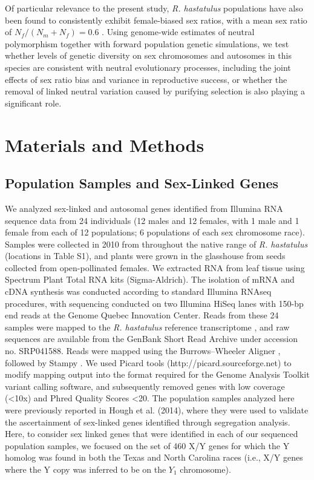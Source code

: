 \documentclass[9pt,twocolumn,twoside]{gsajnl}
\begin{document}
Of particular relevance to the present study, \textit{R. hastatulus} populations have also been found to consistently exhibit female-biased sex ratios, with a mean sex ratio of $N_{f}/(N_{m}+N_{f})=0.6$ \citep{pickup2013influence}. Using genome-wide estimates of neutral polymorphism together with forward population genetic simulations, we test whether levels of genetic diversity on sex chromosomes and autosomes in this species are consistent with neutral evolutionary processes, including the joint effects of sex ratio bias and variance in reproductive success, or whether the removal of linked neutral variation caused by purifying selection is also playing a significant role.

\section*{Materials and Methods}
\subsection*{Population Samples and Sex-Linked Genes}
We analyzed sex-linked and autosomal genes identified from Illumina RNA sequence data from 24 individuals (12 males and 12 females, with 1 male and 1 female from each of 12 populations; 6 populations of each sex chromosome race). Samples were collected in 2010 from throughout the native range of \textit{R. hastatulus} (locations in Table S1), and plants were grown in the glasshouse from seeds collected from open-pollinated females. We extracted RNA from leaf tissue using Spectrum Plant Total RNA kits (Sigma-Aldrich). The isolation of mRNA and cDNA synthesis was conducted according to standard Illumina RNAseq procedures, with sequencing conducted on two Illumina HiSeq lanes with 150-bp end reads at the Genome Quebec Innovation Center. Reads from these 24 samples were mapped to the \textit{R. hastatulus} reference transcriptome \citep{hough2014}, and raw sequences are available from the GenBank Short Read Archive under accession no. SRP041588. Reads were mapped using the Burrows–Wheeler Aligner \citep{li2010fast}, followed by Stampy \citep{lunter2011stampy}. We used Picard tools (http://picard.sourceforge.net) to modify mapping output into the format required for the Genome Analysis Toolkit \citep{mckenna2010genome} variant calling software, and subsequently removed genes with low coverage (<10x) and Phred Quality Scores <20. The population samples analyzed here were previously reported in Hough et al. (2014), where they were used to validate the ascertainment of sex-linked genes identified through segregation analysis. Here, to consider sex linked genes that were identified in each of our sequenced population samples, we focused on the set of 460 X/Y genes for which the Y homolog was found in both the Texas and North Carolina races (i.e., X/Y genes where the Y copy was inferred to be on the $Y_{1}$ chromosome).
\end{document}
